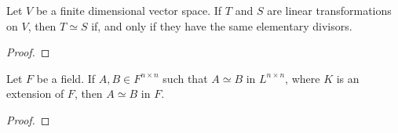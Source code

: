 \begin{theorem}\label{3.4.26}
    Let $V$ be a finite dimensional vector space. If  $T$ and  $S$ are linear
    transformations on  $V$, then  $T \simeq S$ if, and only if they have the
    same elementary divisors.
\end{theorem}
\begin{proof}
\end{proof}
\begin{corollary}
    Let $F$ be a field. If  $A, B \in F^{n \times n}$ such that $A \simeq B$ in
     $L^{n \times n}$, where $K$ is an extension of  $F$, then  $A \simeq B$ in
      $F$.
\end{corollary}
\begin{proof}
\end{proof}
